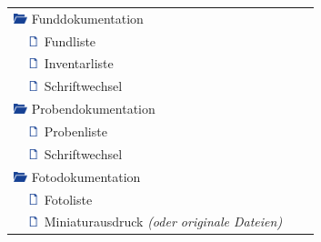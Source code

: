 \begin{center}
\begin{longtable}{l l l l}
		\multicolumn{2}{l}{\includegraphics[width=0.4cm]{bilder/OrdnerIconAuf.png} \hspace*{0.04cm} Funddokumentation}\\
	    & \includegraphics[width=0.4cm]{bilder/DateiIcon.png} \hspace*{0.04cm} Fundliste\\
		& \includegraphics[width=0.4cm]{bilder/DateiIcon.png} \hspace*{0.04cm} Inventarliste\\
		& \includegraphics[width=0.4cm]{bilder/DateiIcon.png} \hspace*{0.04cm} Schriftwechsel\\
		
		\multicolumn{2}{l}{\includegraphics[width=0.4cm]{bilder/OrdnerIconAuf.png} \hspace*{0.04cm} Probendokumentation}\\
	    & \includegraphics[width=0.4cm]{bilder/DateiIcon.png} \hspace*{0.04cm} Probenliste\\
		& \includegraphics[width=0.4cm]{bilder/DateiIcon.png} \hspace*{0.04cm} Schriftwechsel\\
		
		\multicolumn{2}{l}{\includegraphics[width=0.4cm]{bilder/OrdnerIconAuf.png} \hspace*{0.04cm} Fotodokumentation}\\
	    & \includegraphics[width=0.4cm]{bilder/DateiIcon.png} \hspace*{0.04cm} Fotoliste\\
		& \includegraphics[width=0.4cm]{bilder/DateiIcon.png} \hspace*{0.04cm} Miniaturausdruck \textit{(oder originale Dateien)}\\
		

\end{longtable}
\end{center}
